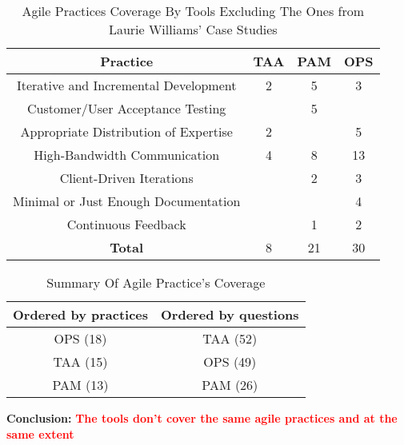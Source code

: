 \begin{table} [H]
\centering
	\footnotesize
	\begin{tabular}{| c | c | c | c |} \hline
		\textbf{Practice} & \textbf{TAA} & \textbf{PAM} & \textbf{OPS} \\ \hline
		Iterative and Incremental Development & 2 & 5 & 3 \\ \hline		
		Customer/User Acceptance Testing & & 5 & \\ \hline		
		Appropriate Distribution of Expertise & 2 & & 5 \\ \hline
		High-Bandwidth Communication & 4 & 8 & 13 \\ \hline					
		Client-Driven Iterations & & 2 & 3 \\ \hline
		Minimal or Just Enough Documentation & & & 4 \\ \hline
		Continuous Feedback & & 1 & 2 \\ \hline
		\textbf{Total} & 8 & 21 & 30 \\ \hline
	\end{tabular}
	\caption{{\footnotesize Agile Practices Coverage By Tools Excluding The Ones from Laurie Williams' Case Studies}}
\end{table}

\clearpage

\begin{table}
\centering
	\begin{tabular}{| c | c |} \hline
		\textbf{Ordered by practices} & \textbf{Ordered by questions} \\ \hline
		OPS (18) & TAA (52) \\ \hline
		TAA (15) & OPS (49) \\ \hline
		PAM (13) & PAM (26) \\ \hline
	\end{tabular}
	\caption{Summary Of Agile Practice's Coverage}
	\label{table:agile_practices_coverage_summary}
\end{table}

\textbf{Conclusion:} \textcolor{red}{\textbf{The tools don't cover the same agile practices and  at the same extent}} \\

\clearpage